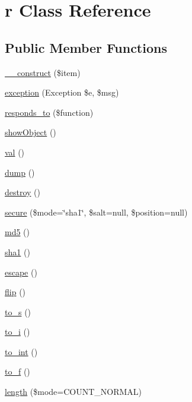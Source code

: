 \hypertarget{classr}{\section{r Class Reference}
\label{classr}
}
\subsection*{Public Member Functions}
\begin{DoxyCompactItemize}
\item 
\hyperlink{classr_a4b0c1fe0e6c94ec2df5006f414b164c4}{\-\_\-\-\_\-construct} (\$item)
\item 
\hyperlink{classr_ac53bb6cc3dad129127779798eb479903}{exception} (Exception \$e, \$msg)
\item 
\hyperlink{classr_ae9afa34c455aa79da5394a608f38386e}{responds\-\_\-to} (\$function)
\item 
\hyperlink{classr_a152d588244df6a865c3f452d7b095a42}{show\-Object} ()
\item 
\hyperlink{classr_af745c1e6bc71ed38a120043c0cb13416}{val} ()
\item 
\hyperlink{classr_a5bf63e4ac70cfd9d97e3f2eab936ec8b}{dump} ()
\item 
\hyperlink{classr_aa118461de946085fe42989193337044a}{destroy} ()
\item 
\hyperlink{classr_a983a9fa784e9028dea46897a760f1210}{secure} (\$mode=\char`\"{}sha1\char`\"{}, \$salt=null, \$position=null)
\item 
\hyperlink{classr_a63b637e71bf8bbee33889ae833423560}{md5} ()
\item 
\hyperlink{classr_a7751a3691d09eba1c3d390fdde2c4f4f}{sha1} ()
\item 
\hyperlink{classr_ab4e6060d5b0dd93113194ba83534d385}{escape} ()
\item 
\hyperlink{classr_ab7b978294481794664ea5ffa6530e020}{flip} ()
\item 
\hyperlink{classr_a4968be1bfca5da3a210d46e21bd080ff}{to\-\_\-s} ()
\item 
\hyperlink{classr_aa1ea52bbf266b7ba98c1198ca335ddf1}{to\-\_\-i} ()
\item 
\hyperlink{classr_a2d59e8b9284086c0dd59203615f28d2e}{to\-\_\-int} ()
\item 
\hyperlink{classr_ad12032cdf12c784eafa8994f13f464df}{to\-\_\-f} ()
\item 
\hyperlink{classr_a93564c0bb378f8d37470946df4d09ceb}{length} (\$mode=C\-O\-U\-N\-T\-\_\-\-N\-O\-R\-M\-A\-L)
\item 

\end{DoxyCompactItemize}
